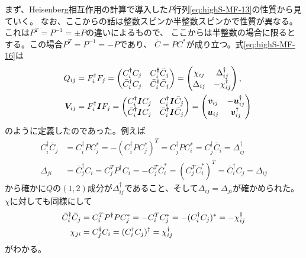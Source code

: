 \documentclass[11pt, aps, longbibliography]{article}
\begin{document}
        まず、Heisenberg相互作用の計算で導入した$P$行列\eqref{eq:highS-MF-13}の性質から見ていく。
        なお、ここからの話は整数スピンか半整数スピンかで性質が異なる。これは$P^T=P^{-1}=\pm P$の違いによるもので、
        ここからは半整数の場合に限るとする。この場合$P^T=P^{-1}=-P$であり、
        $\bar{C}=PC^*$が成り立つ。式\eqref{eq:highS-MF-16}は
        \begin{align}\label{eq:append1-1}
            Q_{ij} &= F_i^\dagger F_j =\begin{pmatrix}
                C_i^\dagger C_j & C_i^\dagger\bar{C}_j \\
                \bar{C}_i^\dagger C_j & \bar{C}_i^\dagger \bar{C}_j
            \end{pmatrix} = \begin{pmatrix}
                \chi_{ij} & \Delta^\dagger_{ij} \\
                \Delta_{ij} & -\chi^\dagger_{ij}
            \end{pmatrix}, \notag \\
            \quad \boldsymbol{V}_{ij} &= F_i^\dagger \boldsymbol{I}F_j = \begin{pmatrix}
                C_i^\dagger \boldsymbol{I}C_j & C_i^\dagger \boldsymbol{I}\bar{C}_j \\
                \bar{C}_i^\dagger \boldsymbol{I}C_j & \bar{C}_i^\dagger \boldsymbol{I}\bar{C}_j
            \end{pmatrix} = \begin{pmatrix}
                \boldsymbol{v}_{ij} & -\boldsymbol{u}_{ij}^\dagger \\ 
                \boldsymbol{u}_{ij} & \boldsymbol{v}_{ij}^\dagger
            \end{pmatrix}
        \end{align}
        のように定義したのであった。例えば
        \begin{align}\label{eq:append1-2}
            C_i^\dagger \bar{C}_j &= C_i^\dagger PC_j^* = -(C_i^\dagger PC_j^*)^T = C_j^\dagger P C_i^* = C_j^\dagger \bar{C}_i = \Delta_{ij}^\dagger \\
            \Delta_{ji} &= \bar{C}_j^\dagger C_i = C_j^T P^\dagger C_i = -C_j^T \bar{C}_i^* = (C_j^T \bar{C}_i^*)^T = \bar{C}_i^\dagger C_j = \Delta_{ij}
        \end{align}
        から確かに$Q$の$(1,2)$成分が$\Delta_{ij}^\dagger$であること、そして$\Delta_{ij}=\Delta_{ji}$が確かめられた。
        $\chi$に対しても同様にして
        \begin{align}\label{eq:append1-7}
            \bar{C}_i^\dagger \bar{C}_j &= C_i^TP^\dagger P C_j^* = -C_i^T C_j^* = -(C_i^\dagger C_j)^* = -\chi_{ij}^\dagger \notag \\
            \chi_{ji} &= C_j^\dagger C_i = (C_i^\dagger C_j)^\dagger = \chi_{ij}^\dagger
        \end{align}
        がわかる。
        
\end{document}
